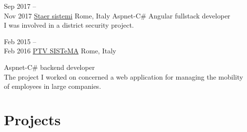 \documentclass[]{friggeri-cv} %
\begin{document}
\begin{entrylist}
\entry
{Sep 2017 --\\ Nov 2017}
{\href{http://www.staersistemi.com/it}{Staer sistemi}}
{Rome, Italy}
{Aspnet-C\# Angular fullstack developer\\ I was involved in a district security project.	
}

\entry
{Feb 2015 --\\ Feb 2016}
{\href{https://www.ptvgroup.com/it/}{PTV SISTeMA}}
{Rome, Italy}
{Aspnet-C\# backend developer\\ 
	The project I worked on concerned a web application for managing the mobility of employees in large companies.

}

\end{entrylist}


\section{Projects}
\end{document}
